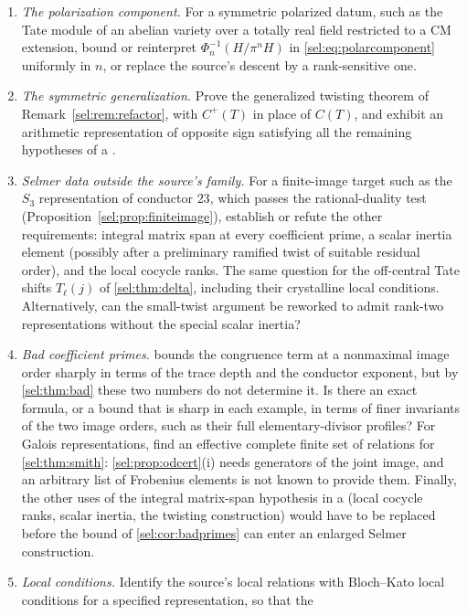 \begin{enumerate}
\item \emph{The polarization component.} For a symmetric polarized datum,
such as the Tate module of an abelian variety over a totally real field
restricted to a CM extension, bound or reinterpret
$\Phi_n^{-1}(H/\pi^nH)$ in \eqref{sel:eq:polarcomponent} uniformly in $n$,
or replace the source's descent by a rank-sensitive one.
\item \emph{The symmetric generalization.} Prove the generalized twisting
theorem of Remark~\ref{sel:rem:refactor}, with $C^+(T)$ in place of $C(T)$, and
exhibit an arithmetic representation of opposite sign satisfying all the
remaining hypotheses of a .
\item \emph{Selmer data outside the source's family.} For a finite-image
target such as the $S_3$ representation of conductor $23$, which passes the
rational-duality test (Proposition~\ref{sel:prop:finiteimage}), establish or refute
the other requirements: integral matrix span at every coefficient prime, a
scalar inertia element (possibly after a preliminary ramified twist of
suitable residual order), and the local cocycle ranks. The same question
for the off-central Tate shifts $T_\ell(j)$ of \cref{sel:thm:delta},
including their crystalline local conditions. Alternatively, can the
small-twist argument be reworked to admit rank-two representations without
the special scalar inertia?
\item \emph{Bad coefficient primes.}  bounds the
congruence term at a nonmaximal image order sharply in terms of the trace
depth and the conductor exponent, but by \cref{sel:thm:bad} these two
numbers do not determine it. Is there an exact formula, or a bound that is
sharp in each example, in terms of finer invariants of the two image
orders, such as their full elementary-divisor profiles? For Galois
representations, find an effective complete finite set of relations for
\cref{sel:thm:smith}: \cref{sel:prop:odcert}(i) needs generators of the
joint image, and an arbitrary list of Frobenius elements is not known to
provide them. Finally, the other uses of the integral matrix-span
hypothesis in a  (local cocycle ranks, scalar inertia,
the twisting construction) would have to be replaced before the bound of
\cref{sel:cor:badprimes} can enter an enlarged Selmer construction.
\item \emph{Local conditions.} Identify the source's local relations with
Bloch--Kato local conditions for a specified representation, so that the

\end{enumerate}
